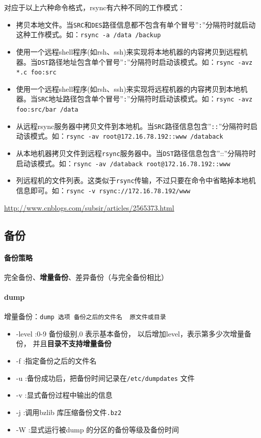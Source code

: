 \documentclass[UTF8,a4paper,12pt]{ctexbook}
\begin{document}
			对应于以上六种命令格式，rsync有六种不同的工作模式：
				\begin{itemize}
					\item 拷贝本地文件。当\verb|SRC|和\verb|DES|路径信息都不包含有单个冒号”\verb|:|”分隔符时就启动这种工作模式。如：\verb|rsync -a /data /backup|
					\item 使用一个远程shell程序(如rsh、ssh)来实现将本地机器的内容拷贝到远程机器。当\verb|DST|路径地址包含单个冒号”\verb|:|”分隔符时启动该模式。如：\verb|rsync -avz *.c foo:src|
					\item 使用一个远程shell程序(如rsh、ssh)来实现将远程机器的内容拷贝到本地机器。当\verb|SRC|地址路径包含单个冒号”\verb|:|”分隔符时启动该模式。如：\verb|rsync -avz foo:src/bar /data|
					\item 从远程rsync服务器中拷贝文件到本地机。当\verb|SRC|路径信息包含”\verb|::|”分隔符时启动该模式。如：\verb|rsync -av root@172.16.78.192::www /databack|
					\item 从本地机器拷贝文件到远程\verb|rsync|服务器中。当\verb|DST|路径信息包含”::”分隔符时启动该模式。如：\verb|rsync -av /databack root@172.16.78.192::www|
					\item 列远程机的文件列表。这类似于\verb|rsync|传输，不过只要在命令中省略掉本地机信息即可。如：\verb|rsync -v rsync://172.16.78.192/www|
				\end{itemize}
				
			\url{http://www.cnblogs.com/subsir/articles/2565373.html}

		\subsection{备份}
			\paragraph{备份策略}完全备份、\textbf{增量备份}、差异备份（与完全备份相比）
			
			\paragraph{dump}增量备份：\verb|dump 选项 备份之后的文件名  原文件或目录|
				\begin{itemize}
					\item -level :0-9 备份级别,0 表示基本备份， 以后增加level，表示第多少次增量备份， 并且\textbf{目录不支持增量备份}
					\item -f :指定备份之后的文件名
					\item -u :备份成功后，把备份时间记录在\verb|/etc/dumpdates| 文件
					\item -v :显式备份过程中输出的信息
					\item -j :调用bzlib 库压缩备份文件\verb|.bz2|
					\item -W :显式运行被dump 的分区的备份等级及备份时间
				\end{itemize}
				
\end{document}

